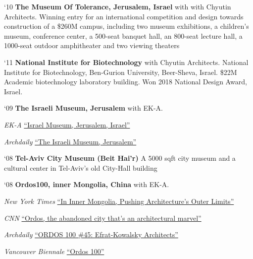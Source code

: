 \begin{tablist}

    \item[`10] \tab \textbf{The Museum Of Tolerance, Jerusalem, Israel} with with Chyutin Architects. Winning entry for an international competition and design towards construction of a \$260M campus, including two museum exhibitions, a children's museum, conference center, a 500-seat banquet hall, an 800-seat lecture hall, a 1000-seat outdoor amphitheater and two viewing theaters

    \item[`11] \tab \textbf{National Institute for Biotechnology} with Chyutin Architects. National Institute for Biotechnology, Ben-Gurion University, Beer-Sheva, Israel. \$22M Academic biotechnology laboratory building. Won 2018 National Design Award, Israel.

    \item[`09] \tab \textbf{The Israeli Museum, Jerusalem} with EK-A.

    \begin{tablist}
        \item[\textit{EK-A}] \href{http://www.efrat-kowalsky.co.il/project/test/}{\enquote{Israel Museum, Jerusalem, Israel}}

        \item[\textit{Archdaily}] \href {https://www.archdaily.com/373684/israel-museum-james-carpenter-design-associates}{\enquote{The Israeli Museum, Jerusalem}}
    \end{tablist}

    \item[`08] \tab \textbf{Tel-Aviv City Museum (Beit Hai'r)} A 5000 sqft city museum and a cultural center in Tel-Aviv’s old City-Hall building

    \item[`08] \tab \textbf{Ordos100, inner Mongolia, China} with EK-A.

    \begin{tablist}
        \item[\textit{New York Times}] \href{https://www.nytimes.com/2008/05/01/garden/01mongolia.html}{\enquote{In Inner Mongolia, Pushing Architecture's Outer Limits}}

        \item[\textit{CNN}] \href{https://www.cnn.com/style/article/china-ordos-ghost-town/index.html}{\enquote{Ordos, the abandoned city that's an architectural marvel}}

        \item[\textit{Archdaily}] \href{https://www.archdaily.com/32535/ordos-100-45-efrat-kowalsky-architects}{\enquote{ORDOS 100 \#45: Efrat‐Kowalsky Architects}}

        \item[\textit{Vancouver Biennale}]
        \href{https://vimeo.com/136530514}{\enquote{Ordos 100}}
    \end{tablist}

\end{tablist}